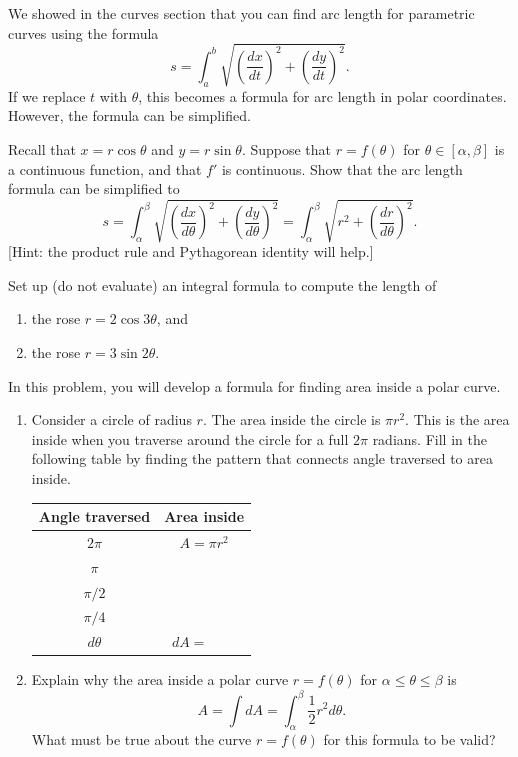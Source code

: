 We showed in the curves section that you can find arc length for parametric curves using the formula 
$$s=\int_a^b\sqrt{\left(\frac{dx}{dt}\right)^2+\left(\frac{dy}{dt}\right)^2}.$$ If we replace $t$ with $\theta$, this becomes a formula for arc length in polar coordinates.  However, the formula can be simplified.

\begin{problem}
%
Recall that $x=r\cos\theta$ and $y=r\sin\theta$. Suppose that $r=f(\theta)$ for $\theta\in[\alpha,\beta]$ is a continuous function, and that $f'$ is continuous.  
Show that the arc length formula can be simplified to 
$$
s=\int_{\alpha}^{\beta}\sqrt{\left(\frac{dx}{d\theta}\right)^2+\left(\frac{dy}{d\theta}\right)^2} 
= \int_{\alpha}^{\beta}\sqrt{r^2+\left(\frac{dr}{d\theta}\right)^2} .$$
[Hint: the product rule and Pythagorean identity will help.]
\end{problem}

\begin{problem} 
%
Set up (do not evaluate) an integral formula to compute the length of 
\begin{enumerate}
\item the rose $r=2\cos 3\theta$, and
\item the rose $r=3\sin 2\theta$.
\end{enumerate}
\end{problem}


\begin{problem}
%
In this problem, you will develop a formula for finding area inside a polar curve.
\begin{enumerate}
\item 
Consider a circle of radius $r$. The area inside the circle is $\pi r^2$. This is the area inside when you traverse around the circle for a full $2\pi$ radians.  Fill in the following table by finding the pattern that connects angle traversed to area inside.
\begin{center}
\begin{tabular}{c|c}
Angle traversed& Area inside\\ \hline
$2\pi$ & $A=\pi r^2$\\
$\pi$ & \\
$\pi/2$ & \\
$\pi/4$ & \\
$d\theta$ & $dA=\quad\quad$
\end{tabular}
\end{center}
\item Explain why the area inside a polar curve $r=f(\theta)$ for $\alpha\leq \theta\leq \beta$ is $$A = \int dA = \int_\alpha^\beta \frac{1}{2}r^2d\theta.$$
What must be true about the curve $r=f(\theta)$ for this formula to be valid?
\end{enumerate}
\end{problem}

